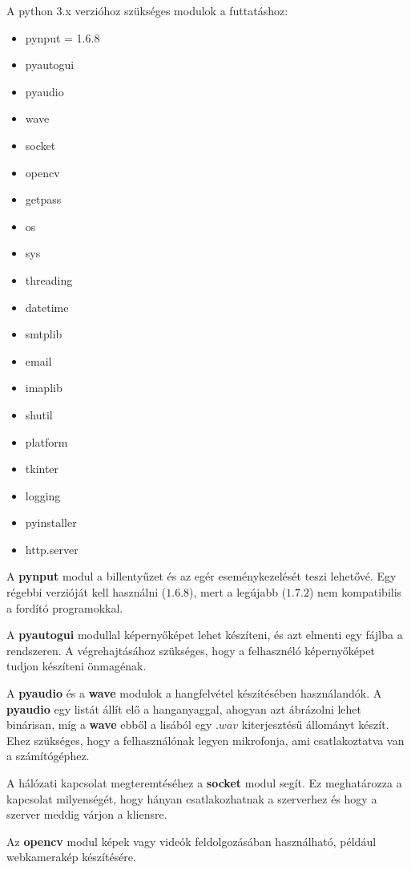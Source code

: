\documentclass[a4paper, 11pt]{article}
\begin{document}
A python 3.x verzióhoz szükséges modulok a futtatáshoz:
\begin{multicols}{2}
\begin{itemize}
\item pynput = 1.6.8
\item pyautogui
\item pyaudio
\item wave
\item socket
\item opencv
\item getpass
\item os
\item sys
\item threading
\item datetime
\item smtplib
\item email
\item imaplib
\item shutil
\item platform
\item tkinter
\item logging
\item pyinstaller
\item http.server
\end{itemize}
\end{multicols}
A \textbf{pynput} modul a billentyűzet és az egér eseménykezelését teszi lehetővé. Egy régebbi verzióját kell használni ($1.6.8$), mert a legújabb ($1.7.2$) nem kompatibilis a fordító programokkal.

A \textbf{pyautogui} modullal képernyőképet lehet készíteni, és azt elmenti egy fájlba a rendszeren. A végrehajtásához szükséges, hogy a felhasznéló képernyőképet tudjon készíteni önmagénak.

A \textbf{pyaudio} és a \textbf{wave} modulok a hangfelvétel készítésében használandók. A \textbf{pyaudio} egy listát állít elő a hanganyaggal, ahogyan azt ábrázolni lehet binárisan, míg a \textbf{wave} ebből a lisából egy $.wav$ kiterjesztésű állományt készít. Ehez szükséges, hogy a felhasználónak legyen mikrofonja, ami csatlakoztatva van a számítógéphez.

A hálózati kapcsolat megteremtéséhez a \textbf{socket} modul segít. Ez meghatározza a kapcsolat milyenségét, hogy hányan csatlakozhatnak a szerverhez és hogy a szerver meddig várjon a kliensre.

Az \textbf{opencv} modul képek vagy videók feldolgozásában használható, például webkamerakép készítésére.
\end{document}
